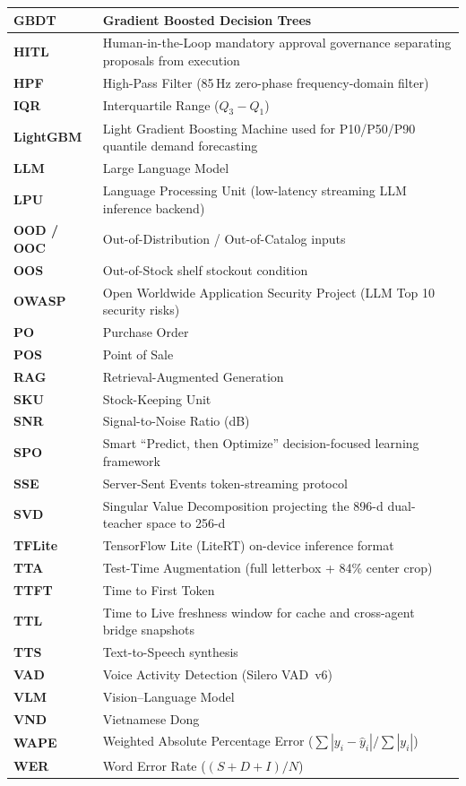 \begin{longtable}{|L{3.4cm}|L{11.1cm}|}
\hline
\textbf{GBDT} & Gradient Boosted Decision Trees \\
\hline
\textbf{HITL} & Human-in-the-Loop mandatory approval governance separating proposals from execution \\
\hline
\textbf{HPF} & High-Pass Filter (85\,Hz zero-phase frequency-domain filter) \\
\hline
\textbf{IQR} & Interquartile Range ($Q_3 - Q_1$) \\
\hline
\textbf{LightGBM} & Light Gradient Boosting Machine used for P10/P50/P90 quantile demand forecasting \\
\hline
\textbf{LLM} & Large Language Model \\
\hline
\textbf{LPU} & Language Processing Unit (low-latency streaming LLM inference backend) \\
\hline
\textbf{OOD / OOC} & Out-of-Distribution / Out-of-Catalog inputs \\
\hline
\textbf{OOS} & Out-of-Stock shelf stockout condition \\
\hline
\textbf{OWASP} & Open Worldwide Application Security Project (LLM Top 10 security risks) \\
\hline
\textbf{PO} & Purchase Order \\
\hline
\textbf{POS} & Point of Sale \\
\hline
\textbf{RAG} & Retrieval-Augmented Generation \\
\hline
\textbf{SKU} & Stock-Keeping Unit \\
\hline
\textbf{SNR} & Signal-to-Noise Ratio (dB) \\
\hline
\textbf{SPO} & Smart ``Predict, then Optimize'' decision-focused learning framework \\
\hline
\textbf{SSE} & Server-Sent Events token-streaming protocol \\
\hline
\textbf{SVD} & Singular Value Decomposition projecting the 896-d dual-teacher space to 256-d \\
\hline
\textbf{TFLite} & TensorFlow Lite (LiteRT) on-device inference format \\
\hline
\textbf{TTA} & Test-Time Augmentation (full letterbox + 84\% center crop) \\
\hline
\textbf{TTFT} & Time to First Token \\
\hline
\textbf{TTL} & Time to Live freshness window for cache and cross-agent bridge snapshots \\
\hline
\textbf{TTS} & Text-to-Speech synthesis \\
\hline
\textbf{VAD} & Voice Activity Detection (Silero VAD~v6) \\
\hline
\textbf{VLM} & Vision--Language Model \\
\hline
\textbf{VND} & Vietnamese Dong \\
\hline
\textbf{WAPE} & Weighted Absolute Percentage Error ($\sum |y_i - \hat{y}_i| / \sum |y_i|$) \\
\hline
\textbf{WER} & Word Error Rate ($(S+D+I)/N$) \\
\hline
\end{longtable}
